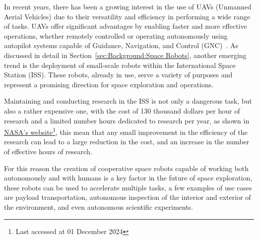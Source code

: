 \par In recent years, there has been a growing interest in the use of UAVs (Unmanned Aerial Vehicles) due to their versatility and efficiency in performing a wide range of tasks. UAVs offer significant advantages by enabling faster and more effective operations, whether remotely controlled or operating autonomously using autopilot systems capable of Guidance, Navigation, and Control (GNC)~\cite{chao2010autopilots}. As discussed in detail in Section~\ref{sec:Background:Space Robots}, another emerging trend is the deployment of small-scale robots within the International Space Station (ISS). These robots, already in use, serve a variety of purposes and represent a promising direction for space exploration and operations.



Maintaining and conducting research in the ISS is not only a dangerous task, but also a rather expensive one, with the cost of 130 thousand dollars per hour of research and a limited number hours dedicated to research per year, as shown in  \href{https://www.nasa.gov/humans-in-space/commercial-and-marketing-pricing-policy/}{NASA's website}\footnote{Last accessed at 01 December 2024}, this mean that any small improvement in the efficiency of the research can lead to a large reduction in the cost, and an increase in the number of effective hours of research.

For this reason the creation of cooperative space robots capable of working both autonomously and with humans is a key factor in the future of space exploration, these robots can be used to accelerate multiple tasks, a few examples of use cases are payload transportation, autonomous inspection of the interior and exterior of the environment, and even autonomous scientific experiments. 